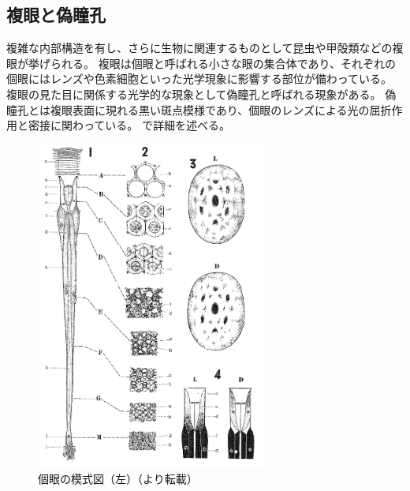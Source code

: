 


\subsection{複眼と偽瞳孔}
\label{SSCompoundeyeandpseudopupil}

複雑な内部構造を有し、さらに生物に関連するものとして昆虫や甲殻類などの複眼が挙げられる。
複眼は個眼と呼ばれる小さな眼の集合体であり、それぞれの個眼にはレンズや色素細胞といった光学現象に影響する部位が備わっている。
複眼の見た目に関係する光学的な現象として偽瞳孔と呼ばれる現象がある。
偽瞳孔とは複眼表面に現れる黒い斑点模様であり、個眼のレンズによる光の屈折作用と密接に関わっている。
で詳細を述べる。

\begin{figure}[htbp]
  \centering
  \includegraphics[width=3.0in]{./img/yagi3-lens-pigment.png}
  \caption{個眼の模式図（左）（\cite{yagi1955studies}より転載）}
  \label{FYagi3LensPigment}
\end{figure}

